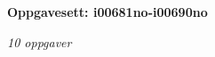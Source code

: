 \centerline{\bf Oppgavesett: i00681no-i00690no}
\vskip 10pt
\centerline{\it 10 oppgaver}\vskip 10pt
\vskip 10pt
